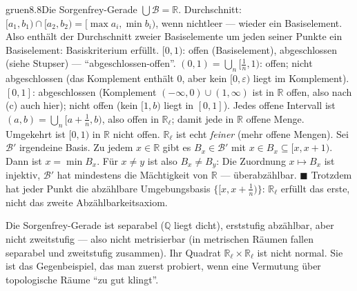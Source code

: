 \stupserzwei{gruen}{(b) $[0, 1)$ ist offen (Basiselement) \emph{und} abgeschlossen, denn das Komplement $(-\infty, 0)\cup[1, \infty) = \bigcup_{a < 0}[a, 0)\cup\bigcup_{b > 1}[1, b)$ ist offen.}{22pt}
\begin{loesungkarte}{gruen}{8.8}{Die Sorgenfrey-Gerade}
$\bigcup\mathcal B = \mathbb R$. Durchschnitt: $[a_1, b_1)\cap[a_2, b_2) = [\max a_i, \min b_i)$, wenn nichtleer --- wieder ein Basiselement. Also enthält der Durchschnitt zweier Basiselemente um jeden seiner Punkte ein Basiselement: Basiskriterium erfüllt. \checkmark
{}
$[0, 1)$: offen (Basiselement), abgeschlossen (siehe Stupser) --- \enquote{abgeschlossen-offen}. $(0, 1) = \bigcup_{n}[\frac1n, 1)$: offen; nicht abgeschlossen (das Komplement enthält $0$, aber kein $[0, \varepsilon)$ liegt im Komplement). $[0, 1]$: abgeschlossen (Komplement $(-\infty, 0)\cup(1, \infty)$ ist in $\mathbb R$ offen, also nach (c) auch hier); nicht offen (kein $[1, b)$ liegt in $[0, 1]$).
Jedes offene Intervall ist $(a, b) = \bigcup_n[a + \frac1n, b)$, also offen in $\mathbb R_\ell$; damit jede in $\mathbb R$ offene Menge. Umgekehrt ist $[0, 1)$ in $\mathbb R$ nicht offen. $\mathbb R_\ell$ ist echt \emph{feiner} (mehr offene Mengen).
Sei $\mathcal B'$ irgendeine Basis. Zu jedem $x\in\mathbb R$ gibt es $B_x\in\mathcal B'$ mit $x\in B_x\subseteq[x, x + 1)$. Dann ist $x = \min B_x$. Für $x\neq y$ ist also $B_x\neq B_y$: Die Zuordnung $x\mapsto B_x$ ist injektiv, $\mathcal B'$ hat mindestens die Mächtigkeit von $\mathbb R$ --- überabzählbar. $\blacksquare$ Trotzdem hat jeder Punkt die abzählbare Umgebungsbasis $\{[x, x + \frac1n)\}$: $\mathbb R_\ell$ erfüllt das erste, nicht das zweite Abzählbarkeitsaxiom.
\begin{mitnehmen}\kastentext
Die Sorgenfrey-Gerade ist separabel ($\mathbb Q$ liegt dicht), erststufig abzählbar, aber nicht zweitstufig --- also nicht metrisierbar (in metrischen Räumen fallen separabel und zweitstufig zusammen). Ihr Quadrat $\mathbb R_\ell\times\mathbb R_\ell$ ist nicht normal. Sie ist das Gegenbeispiel, das man zuerst probiert, wenn eine Vermutung über topologische Räume \enquote{zu gut klingt}.
\end{mitnehmen}
\end{loesungkarte}

